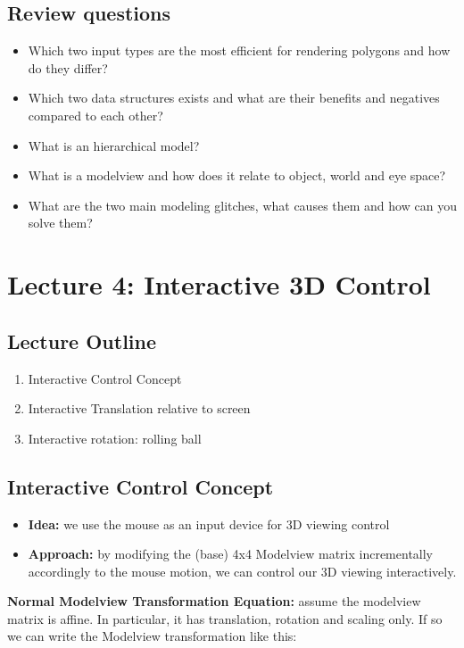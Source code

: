 \documentclass[11pt]{article}
\begin{document}
\subsection{Review questions}
\begin{itemize}
    \item Which two input types are the most efficient for rendering polygons and how do they differ?
    \item Which two data structures exists and what are their benefits and negatives compared to each other?
    \item What is an hierarchical model?
    \item What is a modelview and how does it relate to object, world and eye space?
    \item What are the two main modeling glitches, what causes them and how can you solve them?
\end{itemize}


\section{Lecture 4: Interactive 3D Control}
\subsection*{Lecture Outline}
\begin{enumerate}
    \item Interactive Control Concept
    \item Interactive Translation relative to screen
    \item Interactive rotation: rolling ball
\end{enumerate}

\subsection{Interactive Control Concept}
\begin{itemize}
    \item \textbf{Idea:} we use the mouse as an input device for 3D viewing control
    \item \textbf{Approach:} by modifying the (base) 4x4 Modelview matrix incrementally accordingly to the mouse motion, we can control our 3D viewing interactively. 
\end{itemize}

\textbf{Normal Modelview Transformation Equation:}  assume the modelview matrix is affine. In particular, it has translation, rotation and scaling only. If so we can write the Modelview transformation like this:
\end{document}
